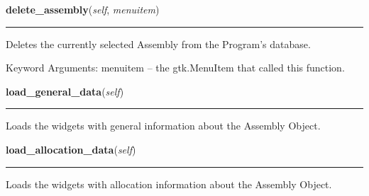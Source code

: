    \vspace{0.5ex}

\hspace{.8\funcindent}\begin{boxedminipage}{\funcwidth}

    \raggedright \textbf{delete\_assembly}(\textit{self}, \textit{menuitem})

    \vspace{-1.5ex}

    \rule{\textwidth}{0.5\fboxrule}
\setlength{\parskip}{2ex}
    Deletes the currently selected Assembly from the Program's database.

    Keyword Arguments: menuitem -- the gtk.MenuItem that called this 
    function.

\setlength{\parskip}{1ex}
    \end{boxedminipage}

    \label{reliafree:assembly:Assembly:load_general_data}

    \vspace{0.5ex}

\hspace{.8\funcindent}\begin{boxedminipage}{\funcwidth}

    \raggedright \textbf{load\_general\_data}(\textit{self})

    \vspace{-1.5ex}

    \rule{\textwidth}{0.5\fboxrule}
\setlength{\parskip}{2ex}
    Loads the widgets with general information about the Assembly Object.

\setlength{\parskip}{1ex}
    \end{boxedminipage}

    \label{reliafree:assembly:Assembly:load_allocation_data}

    \vspace{0.5ex}

\hspace{.8\funcindent}\begin{boxedminipage}{\funcwidth}

    \raggedright \textbf{load\_allocation\_data}(\textit{self})

    \vspace{-1.5ex}

    \rule{\textwidth}{0.5\fboxrule}
\setlength{\parskip}{2ex}
    Loads the widgets with allocation information about the Assembly 
    Object.

\setlength{\parskip}{1ex}
    \end{boxedminipage}

